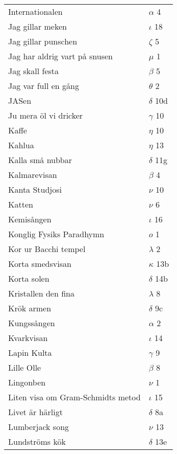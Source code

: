 \documentclass[a6paper,10pt]{article}
\begin{document}
\newpage
\setlength{\oddsidemargin}{-0.47in}
\begin{table}[!h]
\begin{tabular}{l l}
Internationalen&$\alpha$ 4\\
Jag gillar meken&$\iota$ 18\\
Jag gillar punschen&$\zeta$ 5\\
Jag har aldrig vart på snusen&$\mu$ 1\\
Jag skall festa&$\beta$ 5\\
Jag var full en gång&$\theta$ 2\\
JASen&$\delta$ 10d\\
Ju mera öl vi dricker&$\gamma$ 10\\
Kaffe&$\eta$ 10\\
Kahlua&$\eta$ 13\\
Kalla små nubbar&$\delta$ 11g\\
Kalmarevisan&$\beta$ 4\\
Kanta Studjosi&$\nu$ 10\\
Katten&$\nu$ 6\\
Kemisången&$\iota$ 16\\
Konglig Fysiks Paradhymn&$o$ 1\\
Kor ur Bacchi tempel	&$\lambda$ 2\\
Korta smedsvisan&	$\kappa$ 13b\\
Korta solen	&$\delta$ 14b\\
Kristallen den fina&	$\lambda$ 8\\
Krök armen	&$\delta$ 9c\\
Kungssången&	$\alpha$ 2\\
Kvarkvisan	&$\iota$ 14\\
Lapin Kulta&$\gamma$ 9\\
Lille Olle	&$\beta$ 8\\
Lingonben	&$\nu$ 1\\
Liten visa om Gram-Schmidts metod	&$\iota$ 15\\
Livet är härligt&	$\delta$ 8a\\
Lumberjack song	&$\nu$ 13\\
Lundströms kök	&$\delta$ 13e\\
\end{tabular}
\end{table}
\end{document}
